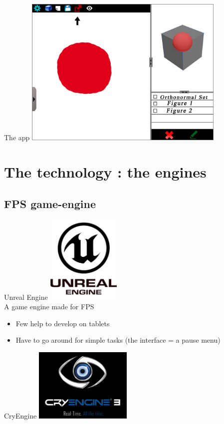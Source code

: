 \documentclass[a4paper,10pt]{beamer}
\begin{document}
			\begin{frame}{The app}
				\includegraphics[height=205pt]{maquette/maquette_8.png}
			\end{frame}
	
	\section{The technology : the engines}
	
		
			
		\subsection{FPS game-engine}
		
			\begin{frame}{Unreal Engine}
				\includegraphics[height=120pt]{images/Unreal_Engine.png}\\
				A game engine made for FPS
				\begin{itemize}
					\item Few help to develop on tablets
					\item Have to go around for simple tasks (the interface = a pause menu)
				\end{itemize}
			\end{frame}
			
			\begin{frame}{CryEngine}
				\includegraphics[height=100pt]{images/Cry_Engine.png}
			\end{frame}
			
\end{document}
